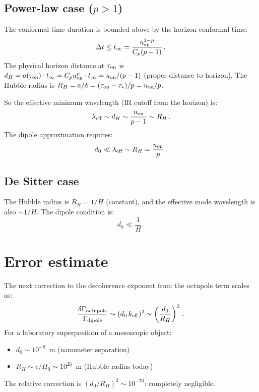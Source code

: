 \documentclass[12pt]{article}
\newcommand{\Scfac}{a}
\newcommand{\lb}{\left}
\newcommand{\rb}{\right}
\begin{document}
\subsection*{Power-law case ($p>1$)}

The conformal time duration is bounded above by the horizon conformal time:
%
\begin{equation}
  \Delta t \leq t_{\infty} = \frac{u_{\rm on}^{1-p}}{C_{p}(p-1)} \,.
\end{equation}
%
The physical horizon distance at $\tau_{\rm on}$ is
$d_{H} = \Scfac(\tau_{\rm on})\cdot t_{\infty} = C_{p}u_{\rm on}^{p}\cdot t_{\infty}
= u_{\rm on}/(p-1)$ (proper distance to horizon).
The Hubble radius is $R_{H} = \Scfac/\dot{\Scfac} = (\tau_{\rm on}-\tau_{*})/p = u_{\rm on}/p$.

So the effective minimum wavelength (IR cutoff from the horizon) is:
%
\begin{equation}
  \lambda_{\rm eff} \sim d_{H} \sim \frac{u_{\rm on}}{p-1} \sim R_{H} \,.
\end{equation}
%
The dipole approximation requires:
%
\begin{equation}
  d_{0} \ll \lambda_{\rm eff} \sim R_{H} = \frac{u_{\rm on}}{p} \,.
  \label{eq:dipole-cond-PL}
\end{equation}

\subsection*{De Sitter case}

The Hubble radius is $R_{H} = 1/H$ (constant), and the effective mode wavelength is
also $\sim 1/H$.  The dipole condition is:
%
\begin{equation}
  d_{0} \ll \frac{1}{H} \,.
  \label{eq:dipole-cond-dS}
\end{equation}

\section*{Error estimate}

The next correction to the decoherence exponent from the octupole term scales as:
%
\begin{equation}
  \frac{\delta\Gamma_{\rm octupole}}{\Gamma_{\rm dipole}}
  \sim
  (d_{0}\,k_{\rm eff})^{2}
  \sim
  \lb(\frac{d_{0}}{R_{H}}\rb)^{2} \,.
\end{equation}
%
For a laboratory superposition of a mesoscopic object:
\begin{itemize}
\item $d_{0} \sim 10^{-9}$~m (nanometer separation)
\item $R_{H} \sim c/H_{0} \sim 10^{26}$~m (Hubble radius today)
\end{itemize}
The relative correction is $(d_{0}/R_{H})^{2} \sim 10^{-70}$: completely negligible.
\end{document}
